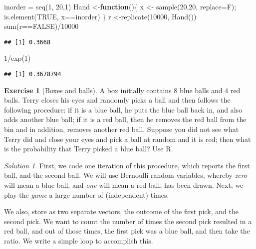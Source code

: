 \documentclass[
]{article}
\newenvironment{Shaded}{\begin{snugshade}}{\end{snugshade}}
\newcommand{\AttributeTok}[1]{\textcolor[rgb]{0.77,0.63,0.00}{#1}}
\newcommand{\ConstantTok}[1]{\textcolor[rgb]{0.00,0.00,0.00}{#1}}
\newcommand{\ControlFlowTok}[1]{\textcolor[rgb]{0.13,0.29,0.53}{\textbf{#1}}}
\newcommand{\DecValTok}[1]{\textcolor[rgb]{0.00,0.00,0.81}{#1}}
\newcommand{\FunctionTok}[1]{\textcolor[rgb]{0.00,0.00,0.00}{#1}}
\newcommand{\NormalTok}[1]{#1}
\newcommand{\OtherTok}[1]{\textcolor[rgb]{0.56,0.35,0.01}{#1}}
\newcommand{\SpecialCharTok}[1]{\textcolor[rgb]{0.00,0.00,0.00}{#1}}
\theoremstyle{definition}
\theoremstyle{definition}
\theoremstyle{definition}
\newtheorem{exercise}{Exercise}[section]
\theoremstyle{remark}
\newtheorem*{solution}{Solution}
\begin{document}
\begin{Shaded}
\begin{Highlighting}[]
\NormalTok{inorder }\OtherTok{=} \FunctionTok{seq}\NormalTok{(}\DecValTok{1}\NormalTok{, }\DecValTok{20}\NormalTok{,}\DecValTok{1}\NormalTok{)}
\NormalTok{Hand }\OtherTok{\textless{}{-}}\ControlFlowTok{function}\NormalTok{()\{}
\NormalTok{x }\OtherTok{\textless{}{-}} \FunctionTok{sample}\NormalTok{(}\DecValTok{20}\NormalTok{,}\DecValTok{20}\NormalTok{, }\AttributeTok{replace=}\NormalTok{F);}
\FunctionTok{is.element}\NormalTok{(}\ConstantTok{TRUE}\NormalTok{, x}\SpecialCharTok{==}\NormalTok{inorder)}
\NormalTok{\}}
\NormalTok{r }\OtherTok{\textless{}{-}}\FunctionTok{replicate}\NormalTok{(}\DecValTok{10000}\NormalTok{, }\FunctionTok{Hand}\NormalTok{())}
\FunctionTok{sum}\NormalTok{(r}\SpecialCharTok{==}\ConstantTok{FALSE}\NormalTok{)}\SpecialCharTok{/}\DecValTok{10000}
\end{Highlighting}
\end{Shaded}

\begin{verbatim}
## [1] 0.3668
\end{verbatim}

\begin{Shaded}
\begin{Highlighting}[]
\DecValTok{1}\SpecialCharTok{/}\FunctionTok{exp}\NormalTok{(}\DecValTok{1}\NormalTok{)}
\end{Highlighting}
\end{Shaded}

\begin{verbatim}
## [1] 0.3678794
\end{verbatim}

\begin{exercise}[Boxes and balls]
\protect\hypertarget{exr:unnamed-chunk-12}{}{\label{exr:unnamed-chunk-12} \iffalse (Boxes and balls) \fi{} } A box initially contains \(8\) blue balls and \(4\) red balls. Terry closes his eyes and randomly picks a ball and then follows the following procedure: if it is a blue ball, he puts the blue ball back in, and also adds another blue ball; if it is a red ball, then he removes the red ball from the bin and in addition, removes another red ball. Suppose you did not see what Terry did and close your eyes and pick a ball at random and it is red; then what is the probability that Terry picked a blue ball? Use R.\\
\end{exercise}
\begin{solution}
\iffalse{} {Solution. } \fi{}First, we code one iteration of this procedure, which reports the first ball, and the second ball. We will use Bernoulli random variables, whereby \emph{zero} will mean a blue ball, and \emph{one} will mean a red ball, has been drawn.
Next, we play the \emph{game} a large number of (independent) times.

We also, store as two separate vectors, the outcome of the first pick, and the second pick. We want to count the number of times the second pick resulted in a red ball, and out of those times, the first pick was a blue ball, and then take the ratio. We write a simple loop to accomplish this.
\end{solution}
\end{document}
